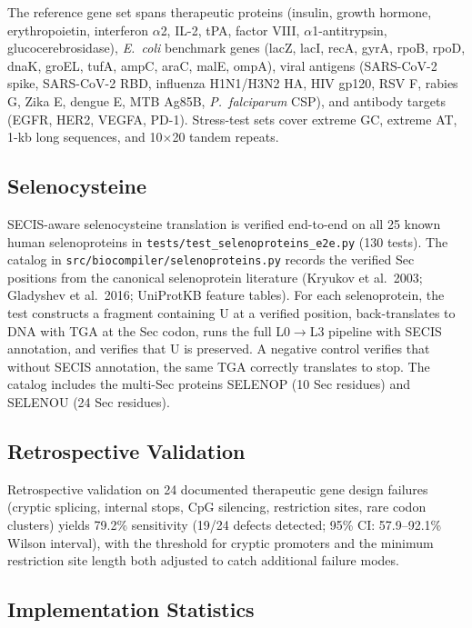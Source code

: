 \documentclass[11pt,a4paper]{article}
\theoremstyle{definition}
\begin{document}
The reference gene set spans therapeutic proteins (insulin, growth hormone, erythropoietin, interferon $\alpha$2, IL-2, tPA, factor VIII, $\alpha$1-antitrypsin, glucocerebrosidase), \textit{E.~coli} benchmark genes (lacZ, lacI, recA, gyrA, rpoB, rpoD, dnaK, groEL, tufA, ampC, araC, malE, ompA), viral antigens (SARS-CoV-2 spike, SARS-CoV-2 RBD, influenza H1N1/H3N2 HA, HIV gp120, RSV F, rabies G, Zika E, dengue E, MTB Ag85B, \textit{P.~falciparum} CSP), and antibody targets (EGFR, HER2, VEGFA, PD-1). Stress-test sets cover extreme GC, extreme AT, 1-kb long sequences, and 10$\times$20 tandem repeats.

\subsection{Selenocysteine}

SECIS-aware selenocysteine translation is verified end-to-end on all 25 known human selenoproteins in \texttt{tests/test\_selenoproteins\_e2e.py} (130 tests). The catalog in \texttt{src/biocompiler/selenoproteins.py} records the verified Sec positions from the canonical selenoprotein literature (Kryukov et al.~2003; Gladyshev et al.~2016; UniProtKB feature tables). For each selenoprotein, the test constructs a fragment containing U at a verified position, back-translates to DNA with TGA at the Sec codon, runs the full L0$\to$L3 pipeline with SECIS annotation, and verifies that U is preserved. A negative control verifies that without SECIS annotation, the same TGA correctly translates to stop. The catalog includes the multi-Sec proteins SELENOP (10 Sec residues) and SELENOU (24 Sec residues).

\subsection{Retrospective Validation}

Retrospective validation on 24 documented therapeutic gene design failures (cryptic splicing, internal stops, CpG silencing, restriction sites, rare codon clusters) yields 79.2\% sensitivity (19/24 defects detected; 95\% CI: 57.9--92.1\% Wilson interval), with the threshold for cryptic promoters and the minimum restriction site length both adjusted to catch additional failure modes.

\subsection{Implementation Statistics}
\end{document}
